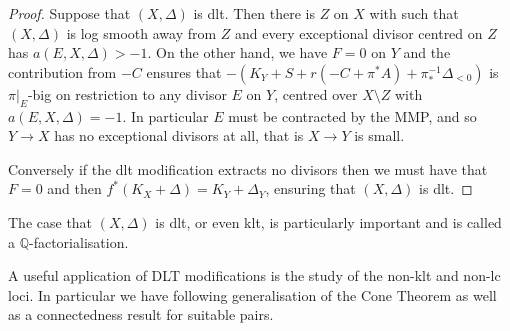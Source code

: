 \documentclass[a4paper,12pt]{book}
\begin{document}
\begin{proof}
 	Suppose that $(X,\Delta)$ is dlt. Then there is $Z$ on $X$ with such that $(X,\Delta)$ is log smooth away from $Z$ and every exceptional divisor centred on $Z$ has $a(E,X,\Delta) > -1$. On the other hand, we have $F=0$ on $Y$ and the contribution from $-C$ ensures that $-(K_{Y}+S+r(-C+\pi^{*}A) + \pi_{*}^{-1}\Delta_{< 0})$ is $\pi|_{E}$-big on restriction to any divisor $E$ on $Y$, centred over $X\setminus Z$ with $a(E,X,\Delta)=-1$. In particular $E$ must be contracted by the MMP, and so $Y \to X$ has no exceptional divisors at all, that is $X \to Y$ is small.
 	
 	Conversely if the dlt modification extracts no divisors then we must have that $F=0$ and then $f^{*}(K_{X}+\Delta)=K_{Y}+\Delta_{Y}$, ensuring that $(X,\Delta)$ is dlt.
	
\end{proof}

The case that $(X,\Delta)$ is dlt, or even klt, is particularly important and is called a $\mathbb{Q}$-factorialisation.

A useful application of DLT modifications is the study of the non-klt and non-lc loci. In particular we have following generalisation of the Cone Theorem as well as a connectedness result for suitable pairs.
\end{document}
